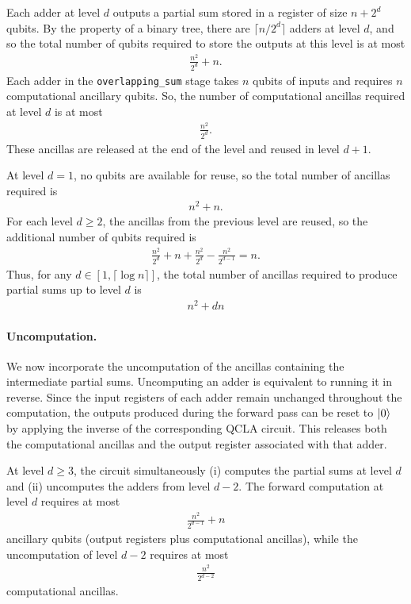 \documentclass[reprint,amsmath,amssymb,aps,pra]{revtex4-2}
\begin{document}
Each adder at level $d$ outputs a partial sum stored in a register of size $n+2^d$ qubits. By the property of a binary tree, there are $\lceil n/2^d\rceil$ adders at level $d$, and so the total number of qubits required to store the outputs at this level is at most
\begin{align}
\frac{n^2}{2^d} + n.
\end{align}
Each adder in the \texttt{overlapping\_sum} stage takes $n$ qubits of inputs and requires $n$ computational ancillary qubits. So, the number of computational ancillas required at level $d$ is at most
\begin{align}
\frac{n^2}{2^d}.
\end{align}
These ancillas are released at the end of the level and reused in level $d+1$.

At level $d=1$, no qubits are available for reuse, so the total number of ancillas required is
\begin{align}
n^2 + n.
\end{align}
For each level $d\ge 2$, the ancillas from the previous level are reused, so the additional number of qubits required is
\begin{align}
\frac{n^2}{2^{d}} + n +\frac{n^2}{2^{d}}  - \frac{n^2}{2^{d-1}} = n.
\end{align}
Thus, for any $d \in [1,\lceil \log n\rceil]$, the total number of ancillas required to produce partial sums up to level $d$ is
\begin{align}
    n^2 + dn
    \label{eq:sum_qubits_rewrite}
\end{align}

\paragraph{Uncomputation.}
We now incorporate the uncomputation of the ancillas containing the intermediate partial sums. 
Uncomputing an adder is equivalent to running it in reverse. Since the input registers of each adder remain unchanged throughout the computation, the outputs produced during the forward pass can be reset to $\ket{0}$ by applying the inverse of the corresponding QCLA circuit. This releases both the computational ancillas and the output register associated with that adder.

At level $d \ge 3$, the circuit simultaneously (i) computes the partial sums at level $d$ and (ii) uncomputes the adders from level $d-2$. The forward computation at level $d$ requires at most
\begin{align}
\frac{n^2}{2^{d-1}} + n 
\end{align}
ancillary qubits (output registers plus computational ancillas), while the uncomputation of level $d-2$ requires at most
\begin{align}   
\frac{n^2}{2^{d-2}}
\end{align}
computational ancillas.
\end{document}
